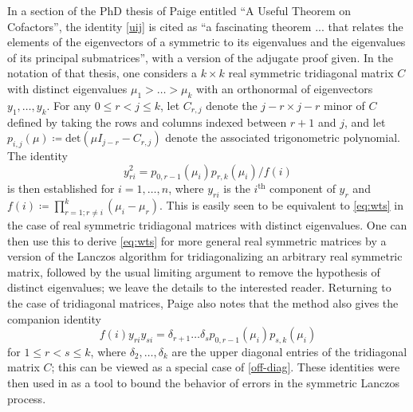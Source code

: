 \documentclass{amsart}
\begin{document}
In a section \cite[Section 8.2]{paige_1971} of the PhD thesis of Paige entitled ``A Useful Theorem on Cofactors'', the identity \eqref{uij} is cited as ``a fascinating theorem ... that relates the elements of the eigenvectors of a symmetric to its eigenvalues and the eigenvalues of its principal submatrices'', with a version of the adjugate proof given.  In the notation of that thesis, one considers a $k \times k$ real symmetric tridiagonal matrix $C$ with distinct eigenvalues $\mu_1 > \dots > \mu_k$ with an orthonormal of eigenvectors $y_1,\dots,y_k$.  For any $0 \leq r < j \leq k$, let $C_{r,j}$ denote the $j-r \times j-r$ minor of $C$ defined by taking the rows and columns indexed between $r+1$ and $j$, and let $p_{i,j}(\mu) \coloneqq \mathrm{det}( \mu I_{j-r} - C_{r,j} )$ denote the associated trigonometric polynomial.  The identity
\begin{equation}\label{yri} y_{ri}^2 = p_{0,r-1}(\mu_i) p_{r,k}(\mu_i) / f(i)
\end{equation}
is then established for $i=1,\dots,n$, where $y_{ri}$ is the $i^{\mathrm{th}}$ component of $y_r$ and $f(i) \coloneqq \prod_{r=1; r \neq i}^k (\mu_i-\mu_r)$.  This is easily seen to be equivalent to \eqref{eq:wts} in the case of real symmetric tridiagonal matrices with distinct eigenvalues.  One can then use this to derive \eqref{eq:wts} for more general real symmetric matrices by a version of the Lanczos algorithm for tridiagonalizing an arbitrary real symmetric matrix, followed by the usual limiting argument to remove the hypothesis of distinct eigenvalues; we leave the details to the interested reader.  Returning to the case of tridiagonal matrices, Paige also notes that the method also gives the companion identity
\begin{equation}\label{yri-2}
 f(i) y_{ri} y_{si} = \delta_{r+1} \dots \delta_s p_{0,r-1}(\mu_i) p_{s,k}(\mu_i)
\end{equation}
for $1 \leq r < s \leq k$, where $\delta_2,\dots,\delta_k$ are the upper diagonal entries of the tridiagonal matrix $C$; this can be viewed as a special case of \eqref{off-diag}.  These identities were then used in \cite[Section 8]{paige_1971} as a tool to bound the behavior of errors in the symmetric Lanczos process.
\end{document}
